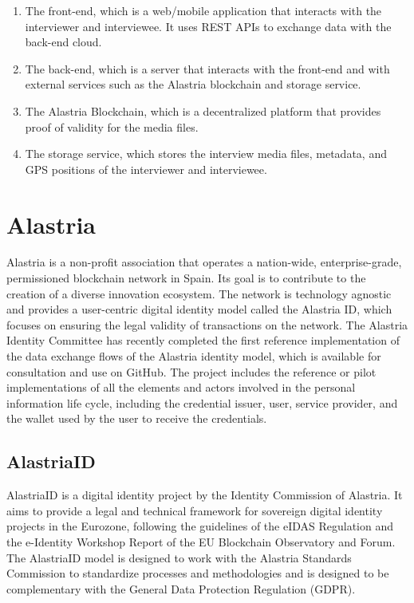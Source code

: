 \documentclass[target=mst,aauheader=]{thud}
\begin{document}
\begin{enumerate}
    \item The front-end, which is a web/mobile application that interacts with the interviewer and interviewee. It uses REST APIs to exchange data with the back-end cloud.
    
    \item The back-end, which is a server that interacts with the front-end and with external services such as the Alastria blockchain and storage service.

    \item The Alastria Blockchain, which is a decentralized platform that provides proof of validity for the media files.

    \item The storage service, which stores the interview media files, metadata, and GPS positions of the interviewer and interviewee.
    
\end{enumerate}

\chapter{Alastria}

Alastria is a non-profit association that operates a nation-wide, enterprise-grade, permissioned blockchain network in Spain. Its goal is to contribute to the creation of a diverse innovation ecosystem. The network is technology agnostic and provides a user-centric digital identity model called the Alastria ID, which focuses on ensuring the legal validity of transactions on the network. The Alastria Identity Committee has recently completed the first reference implementation of the data exchange flows of the Alastria identity model, which is available for consultation and use on GitHub. The project includes the reference or pilot implementations of all the elements and actors involved in the personal information life cycle, including the credential issuer, user, service provider, and the wallet used by the user to receive the credentials.

\section{AlastriaID}

AlastriaID is a digital identity project by the Identity Commission of Alastria. It aims to provide a legal and technical framework for sovereign digital identity projects in the Eurozone, following the guidelines of the eIDAS Regulation and the e-Identity Workshop Report of the EU Blockchain Observatory and Forum. The AlastriaID model is designed to work with the Alastria Standards Commission to standardize processes and methodologies and is designed to be complementary with the General Data Protection Regulation (GDPR).
\end{document}
